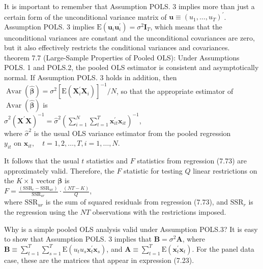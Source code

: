 \documentclass[10pt]{article}
\begin{document}
It is important to remember that Assumption POLS. 3 implies more than just a certain form of the unconditional variance matrix of $\mathbf{u} \equiv\left(u_{1}, \ldots, u_{T}\right)^{\prime}$. Assumption POLS. 3 implies $\mathrm{E}\left(\mathbf{u}_{i} \mathbf{u}_{i}^{\prime}\right)=\sigma^{2} \mathbf{I}_{T}$, which means that the unconditional variances are constant and the unconditional covariances are zero, but it also effectively restricts the conditional variances and covariances.\\
theorem 7.7 (Large-Sample Properties of Pooled OLS): Under Assumptions POLS. 1 and POLS.2, the pooled OLS estimator is consistent and asymptotically normal. If Assumption POLS. 3 holds in addition, then $\operatorname{Avar}(\hat{\boldsymbol{\beta}})=\sigma^{2}\left[\mathrm{E}\left(\mathbf{X}_{i}^{\prime} \mathbf{X}_{i}\right)\right]^{-1} / N$, so that the appropriate estimator of $\operatorname{Avar}(\hat{\boldsymbol{\beta}})$ is\\
$\hat{\sigma}^{2}\left(\mathbf{X}^{\prime} \mathbf{X}\right)^{-1}=\hat{\sigma}^{2}\left(\sum_{i=1}^{N} \sum_{t=1}^{T} \mathbf{x}_{i t}^{\prime} \mathbf{x}_{i t}\right)^{-1}$,\\
where $\hat{\sigma}^{2}$ is the usual OLS variance estimator from the pooled regression\\
$y_{i t}$ on $\mathbf{x}_{i t}, \quad t=1,2, \ldots, T, i=1, \ldots, N$.

It follows that the usual $t$ statistics and $F$ statistics from regression (7.73) are approximately valid. Therefore, the $F$ statistic for testing $Q$ linear restrictions on the $K \times 1$ vector $\boldsymbol{\beta}$ is\\
$F=\frac{\left(\mathrm{SSR}_{r}-\mathrm{SSR}_{u r}\right)}{\mathrm{SSR}_{u r}} \cdot \frac{(N T-K)}{Q}$,\\
where $\mathrm{SSR}_{u r}$ is the sum of squared residuals from regression (7.73), and $\mathrm{SSR}_{r}$ is the regression using the $N T$ observations with the restrictions imposed.

Why is a simple pooled OLS analysis valid under Assumption POLS.3? It is easy to show that Assumption POLS. 3 implies that $\mathbf{B}=\sigma^{2} \mathbf{A}$, where $\mathbf{B} \equiv \sum_{t=1}^{T} \sum_{s=1}^{T} \mathrm{E}\left(u_{t} u_{s} \mathbf{x}_{t}^{\prime} \mathbf{x}_{s}\right)$, and $\mathbf{A} \equiv \sum_{t=1}^{T} \mathrm{E}\left(\mathbf{x}_{t}^{\prime} \mathbf{x}_{t}\right)$. For the panel data case, these are the matrices that appear in expression (7.23).
\end{document}
